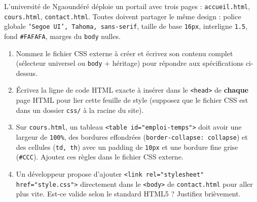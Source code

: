 \documentclass[11pt]{article}
\begin{document}
\begin{exercice}
L'université de Ngaoundéré déploie un portail avec trois pages : \texttt{accueil.html}, \texttt{cours.html}, \texttt{contact.html}. Toutes doivent partager le même design : police globale \texttt{'Segoe UI', Tahoma, sans-serif}, taille de base \texttt{16px}, interligne \texttt{1.5}, fond \texttt{\#FAFAFA}, marges du \texttt{body} nulles.
\begin{enumerate}
    \item Nommez le fichier CSS externe à créer et écrivez son contenu complet (sélecteur universel ou \texttt{body} + héritage) pour répondre aux spécifications ci-dessus.
    \item Écrivez la ligne de code HTML exacte à insérer dans le \texttt{<head>} de \textbf{chaque} page HTML pour lier cette feuille de style (supposez que le fichier CSS est dans un dossier \texttt{css/} à la racine du site).
    \item Sur \texttt{cours.html}, un tableau \texttt{<table id="emploi-temps">} doit avoir une largeur de \texttt{100\%}, des bordures effondrées (\texttt{border-collapse: collapse}) et des cellules (\texttt{td, th}) avec un padding de \texttt{10px} et une bordure fine grise (\texttt{\#CCC}). Ajoutez ces règles dans le fichier CSS externe.
    \item Un développeur propose d'ajouter \texttt{<link rel="stylesheet" href="style.css">} directement dans le \texttt{<body>} de \texttt{contact.html} pour \og{}aller plus vite\fg{}. Est-ce valide selon le standard HTML5 ? Justifiez brièvement.
\end{enumerate}
\end{exercice}
\end{document}
